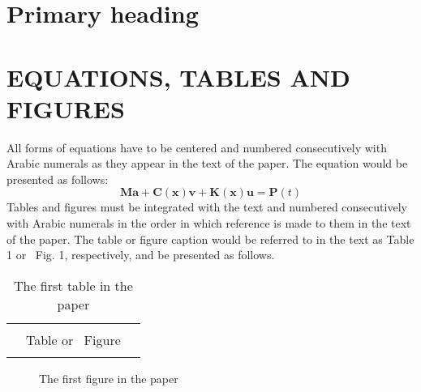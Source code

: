 \documentclass[12pt]{ksiamproc}
\begin{document}
	\section*{Primary heading}\noindent%
	
	
	\section*{EQUATIONS, TABLES AND FIGURES}\noindent%
	All forms of equations have to be centered and numbered
	consecutively with Arabic numerals as they appear in the text of
	the paper. The equation would be presented as follows:
	\begin{equation}\label{eq:1}
		\mathbf{Ma}+\mathbf{C(x)v}+\mathbf{K(x)u}=\mathbf{P}(t)
	\end{equation}
	Tables and figures must be integrated with the text and numbered
	consecutively with Arabic numerals in the order in which reference
	is made to them in the text of the paper.  The table or figure
	caption would be referred to in the text as Table 1 or~ Fig. 1,
	respectively, and be presented as follows.
	
	\begin{table}[ht]
		\caption{The first table in the paper}
		\begin{tabular}{|ccc|}\hline
			&&\\
			\phantom{MMMMMMMMMMMMMMMM}& Table or~ Figure&\phantom{MMMMMMMMMMMMMMMM}\\
			&&\\ \hline
		\end{tabular}
	\end{table}
	
	\begin{figure}[ht]
		\caption{\label{fig:fig1} The first figure in the paper}
	\end{figure}
\end{document}
